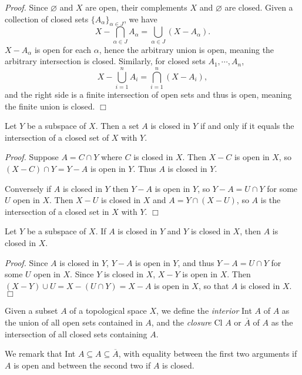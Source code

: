 {\it Proof.} Since $\varnothing$ and $X$ are open, their complements $X$ and $\varnothing$ are closed. Given a collection of closed sets $\{A_\alpha\}_{\alpha \in J}$, we have
$$X - \bigcap_{\alpha \in J} A_\alpha = \bigcup_{\alpha \in J} (X - A_\alpha).$$
$X - A_\alpha$ is open for each $\alpha$, hence the arbitrary union is open, meaning the arbitrary intersection is closed. Similarly, for closed sets $A_1, \cdots, A_n$,
$$X - \bigcup_{i=1}^nA_i = \bigcap_{i=1}^n(X- A_i),$$
and the right side is a finite intersection of open sets and thus is open, meaning the finite union is closed. $\Box$

\begin{theorem}\label{2.21}
    Let $Y$ be a subspace of $X$. Then a set $A$ is closed in $Y$ if and only if it equals the intersection of a closed set of $X$ with $Y.$
\end{theorem}
{\it Proof.} Suppose $A = C \cap Y$ where $C$ is closed in $X$. Then $X - C$ is open in $X$, so $(X - C) \cap Y = Y - A$ is open in $Y$. Thus $A$ is closed in $Y$.

Conversely if $A$ is closed in $Y$ then $Y-A$ is open in $Y$, so $Y - A = U \cap Y$ for some $U$ open in $X$. Then $X - U$ is closed in $X$ and $A = Y \cap (X - U)$, so $A$ is the intersection of a closed set in $X$ with $Y.$ $\Box$

\begin{theorem}\label{2.22}
    Let $Y$ be a subspace of $X$. If $A$ is closed in $Y$ and $Y$ is closed in $X$, then $A$ is closed in $X$.
\end{theorem}
{\it Proof.} Since $A$ is closed in $Y$, $Y-A$ is open in $Y$, and thus $Y - A = U \cap Y$ for some $U$ open in $X.$ Since $Y$ is closed in $X$, $X - Y$ is open in $X$. Then $(X-Y) \cup U = X - (U \cap Y) = X - A$ is open in $X$, so that $A$ is closed in $X$. $\Box$

\begin{definition}\label{2.23}
    Given a subset $A$ of a topological space $X$, we define the {\it interior} Int $A$ of $A$ as the union of all open sets contained in $A$, and the {\it closure} Cl $A$ or $\overline{A}$ of $A$ as the intersection of all closed sets containing $A$.
\end{definition}
We remark that Int $A \subseteq A \subseteq \overline{A}$, with equality between the first two arguments if $A$ is open and between the second two if $A$ is closed.

